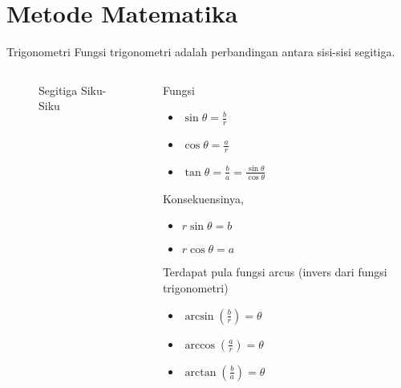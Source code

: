 \documentclass[handout,11pt]{beamer}
\begin{document}
\section{Metode Matematika}
\label{sec:Metode Matematika}

\begin{frame}[shrink]{Trigonometri}
  Fungsi trigonometri adalah perbandingan antara sisi-sisi segitiga.
  \begin{columns}[c]
  
  \begin{figure}[h]
  \begin{center}
  \end{center}
  \caption{Segitiga Siku-Siku}
  \end{figure}
  
  
  \begin{block}{Fungsi}
    \begin{itemize}
      \item $\sin \theta = \frac{b}{r}$
      \item $\cos \theta = \frac{a}{r}$
      \item $\tan \theta = \frac{b}{a} = \frac{\sin \theta}{\cos \theta}$
    \end{itemize}
    Konsekuensinya,
    \begin{itemize}
      \item $r\sin \theta = b$
      \item $r\cos \theta = a$
    \end{itemize}
    Terdapat pula fungsi arcus (invers dari fungsi trigonometri)
    \begin{itemize}
      \item $\arcsin(\frac{b}{r}) = \theta$
      \item $\arccos(\frac{a}{r}) = \theta$
      \item $\arctan(\frac{b}{a}) = \theta$
    \end{itemize}
  \end{block}
  \end{columns}
\end{frame}
\end{document}
